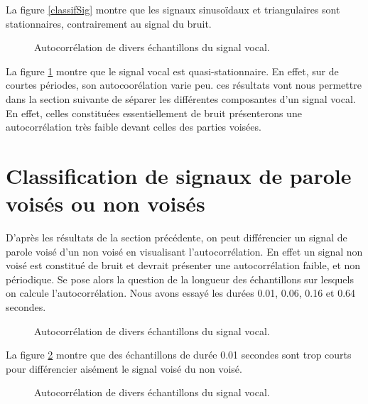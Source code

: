 \documentclass[french]{article}
\begin{document}
La figure \ref{classifSig} montre que les signaux sinusoïdaux et triangulaires sont stationnaires, contrairement au signal du bruit.
\FloatBarrier
\begin{figure}[h!]
\centering

\caption{Autocorrélation de divers échantillons du signal vocal.}
\label{classifAh}
\end{figure}

La figure \ref{classifAh} montre que le signal vocal est quasi-stationnaire. En effet, sur de courtes périodes, son autocoorélation varie peu. ces résultats vont nous permettre dans la section suivante de séparer les différentes composantes d'un signal vocal. En effet, celles constituées essentiellement de bruit présenterons une autocorrélation très faible devant celles des parties voisées.

\FloatBarrier

\section{ Classification de signaux de parole voisés ou non voisés}

\label{sect:autocorr_voise}

D'après les résultats de la section précédente, on peut différencier un signal de parole voisé d'un non voisé en visualisant l'autocorrélation. En effet un signal non voisé est constitué de bruit et devrait présenter une autocorrélation faible, et non périodique. Se pose alors la question de la longueur des échantillons sur lesquels on calcule l'autocorrélation. Nous avons essayé les durées 0.01, 0.06, 0.16 et 0.64 secondes.

\begin{figure}[h!]
\centering

\caption{Autocorrélation de divers échantillons du signal vocal.}
\label{classif1}
\end{figure}

La figure \ref{classif1} montre que des échantillons de durée 0.01 secondes sont trop courts pour différencier aisément le signal voisé du non voisé.
\FloatBarrier
\begin{figure}[h!]
\centering

\caption{Autocorrélation de divers échantillons du signal vocal.}
\label{classif4}
\end{figure}
\end{document}
